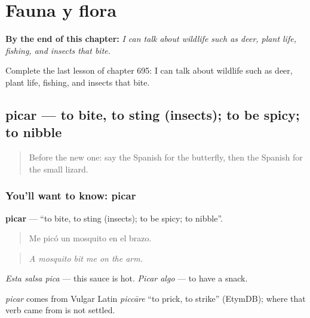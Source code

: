 
\chapter{Fauna y flora}
\label{ch:es-fauna-y-flora}

\begin{chapteropening}
\textbf{By the end of this chapter:} \emph{I can talk about wildlife such as deer, plant life, fishing, and insects that bite.}

Complete the last lesson of chapter 695: I can talk about wildlife such as deer, plant life, fishing, and insects that bite.
\end{chapteropening}

\section[picar]{picar — to bite, to sting (insects); to be spicy; to nibble}

\label{lesson:ES-C695-picar}



\begin{quote}
Before the new one: say the Spanish for the butterfly, then the Spanish for the small lizard.
\end{quote}

\subsection*{You'll want to know: picar}
\textbf{picar} — \textquotedblleft{}to bite, to sting (insects); to be spicy; to nibble\textquotedblright{}.

\begin{quote}
Me picó un mosquito en el brazo.
\end{quote}

\begin{quote}
\emph{A mosquito bit me on the arm.}
\end{quote}

\emph{Esta salsa pica} — this sauce is hot. \emph{Picar algo} — to have a snack.

\begin{cousinweb}
\emph{picar} comes from Vulgar Latin \emph{piccāre} \textquotedblleft{}to prick, to strike\textquotedblright{} (EtymDB); where that verb came from is not settled.
\end{cousinweb}

